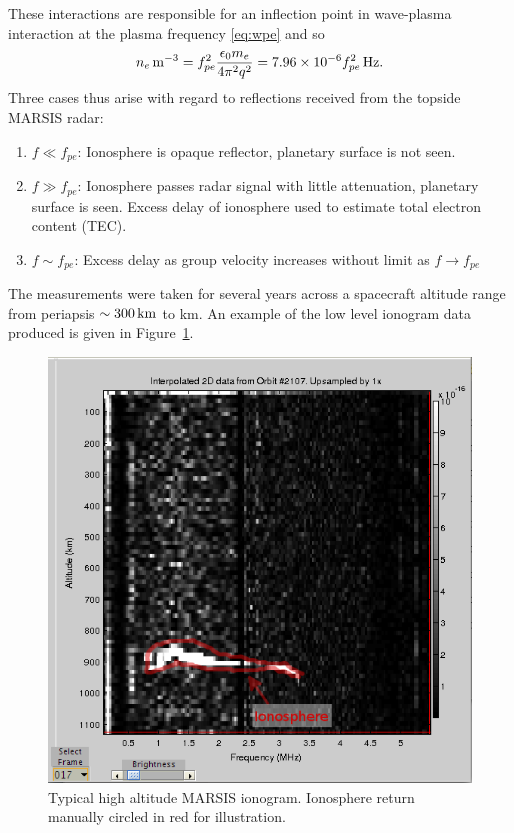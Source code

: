 These interactions are responsible for an inflection point in wave-plasma interaction at the plasma frequency \eqref{eq:wpe} and so
\begin{equation}\label{eq:fpe}
\unit[n_e]{m^{-3}} = f_{pe}^2 \frac{\epsilon_0 m_e}{4 \pi^2 q^2} = 7.96\times10^{-6} \unit[f_{pe}^2]{Hz}.
\end{equation}
Three cases thus arise with regard to reflections received from the topside MARSIS radar:
\begin{enumerate}
	\item $f \ll f_{pe}$: Ionosphere is opaque reflector, planetary surface is not seen.
	\item $f \gg f_{pe}$: Ionosphere passes radar signal with little attenuation, planetary surface is seen. Excess delay of ionosphere used to estimate total electron content (TEC). 
	\item $f \sim f_{pe}$: Excess delay as group velocity increases without limit as $f\rightarrow f_{pe}$ 
\end{enumerate}	
The measurements were taken for several years across a spacecraft altitude range from periapsis $\sim \unit[300]{km}$ to \unit[1200]{km}.
An example of the low level ionogram data produced is given in Figure~\ref{fig:ionogram}.
\begin{figure}\centering
    \includegraphics[width=0.9\linewidth]{gfx/DataFrameExample}
    \caption{Typical high altitude MARSIS ionogram. Ionosphere return manually circled in red for illustration.}\label{fig:ionogram}
\end{figure}
